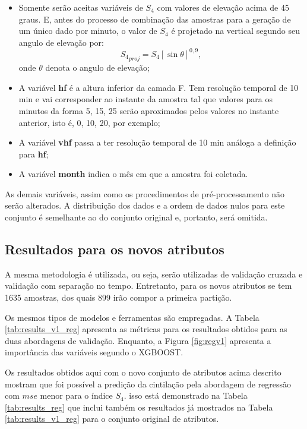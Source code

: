 \begin{itemize}
\item Somente serão aceitas variáveis de $S_4$ com valores de elevação acima de 45 graus. E, antes do processo de combinação das amostras para a geração de um único dado por minuto, o valor de $S_4$ é projetado na vertical segundo seu angulo de elevação por:
\begin{equation}
{S_4}_{proj}=S_4[\sin\theta]^{0,9}\mbox{,}~
\end{equation}
onde $\theta$ denota o angulo de elevação;
\item A variável {\bf hf} é a altura inferior da camada F. Tem resolução temporal de 10 min e vai corresponder ao instante da amostra tal que valores para os minutos da forma 5, 15, 25 serão aproximados pelos valores no instante anterior, isto é, 0, 10, 20, por exemplo;
\item A variável {\bf vhf} passa a ter resolução temporal de 10 min análoga a definição para {\bf hf};
\item A variável {\bf month} indica o mês em que a amostra foi coletada.
\end{itemize}

As demais variáveis, assim como os procedimentos de pré-processamento não serão alterados. A distribuição dos dados e a ordem de dados nulos para este conjunto é semelhante ao do conjunto original e, portanto, será omitida.

\subsection{Resultados para os novos atributos}

A mesma metodologia é utilizada, ou seja, serão utilizadas de validação cruzada e validação com separação no tempo. Entretanto, para os novos atributos se tem 1635 amostras, dos quais 899 irão compor a primeira partição.

Os mesmos tipos de modelos e ferramentas são empregadas. A Tabela \ref{tab:results_v1_reg} apresenta as métricas para os resultados obtidos para as duas abordagens de validação. Enquanto, a Figura \ref{fig:regv1} apresenta a importância das variáveis segundo o XGBOOST.

Os resultados obtidos aqui com o novo conjunto de atributos acima descrito mostram que foi possível a predição da cintilação pela abordagem de regressão com $mse$ menor para o índice $S_4$. isso está demonstrado na Tabela \ref{tab:results_reg} que inclui também os resultados já mostrados na Tabela \ref{tab:results_v1_reg} para o conjunto original de atributos.


